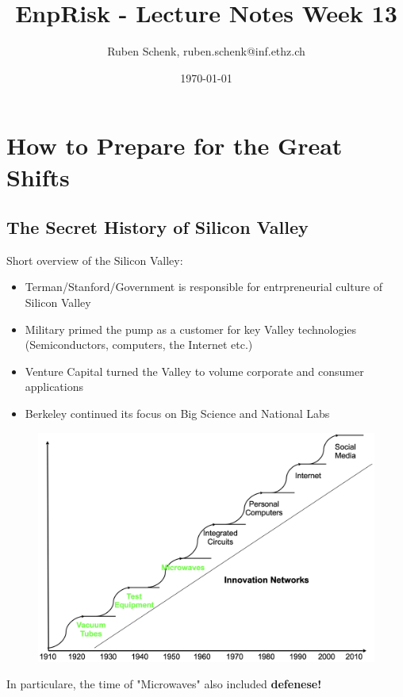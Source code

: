 \documentclass[a4paper]{extarticle}
\title{EnpRisk - Lecture Notes Week 13}
\author{Ruben Schenk, ruben.schenk@inf.ethz.ch}
\date{\today}
\begin{document}
\maketitle

\section{How to Prepare for the Great Shifts}

\subsection{The Secret History of Silicon Valley}

Short overview of the Silicon Valley:

\begin{itemize}
    \item Terman/Stanford/Government is responsible for entrpreneurial culture of Silicon Valley
    \item Military primed the pump as a customer for key Valley technologies (Semiconductors, computers, the Internet etc.)
    \item Venture Capital turned the Valley to volume corporate and consumer applications
    \item Berkeley continued its focus on Big Science and National Labs
\end{itemize}

\begin{figure}[H]
    \includegraphics[width=15cm]{../images/EnpRisk_Fig13-1}
    \centering
\end{figure}

In particulare, the time of "Microwaves" also included \textbf{defenese!}
\end{document}
